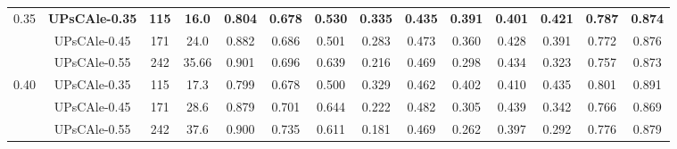 \begin{table*}
\begin{scriptsize}
\begin{tabular}{|c||c|c|c|c||c|c|c|c|c|c|c|c|c|}
\multirow{3}{*}{0.35} 
& \textbf{UPsCAle-0.35 }& \textbf{115}&\textbf{16.0} &\textbf{0.804} & \textbf{0.678} &  \textbf{0.530 }& \textbf{0.335 }& \textbf{0.435} & \textbf{0.391} & \textbf{0.401 }& \textbf{0.421} &\textbf{ 0.787} & \textbf{0.874}
\\ 
 & UPsCAle-0.45 & 171&24.0 &0.882 & 0.686 &  0.501 & 0.283 & 0.473 & 0.360 & 0.428 & 0.391 & 0.772 & 0.876
\\ 
 & UPsCAle-0.55 & 242&35.66 &0.901 & 0.696 &  0.639 & 0.216 & 0.469 & 0.298 & 0.434 & 0.323 & 0.757 & 0.873
\\ \hline

\multirow{3}{*}{0.40} 
 & UPsCAle-0.35 & 115&17.3 &0.799 & 0.678 &  0.500 & 0.329 & 0.462 & 0.402 & 0.410 & 0.435 & 0.801 & 0.891
\\ 
 & UPsCAle-0.45 & 171&28.6 &0.879 & 0.701 &  0.644 & 0.222 & 0.482 & 0.305 & 0.439 & 0.342 & 0.766 & 0.869
\\ 
 & UPsCAle-0.55 & 242&37.6 &0.900 & 0.735 &  0.611 & 0.181 & 0.469 & 0.262 & 0.397 & 0.292 & 0.776 & 0.879
\\ \hline


\end{tabular}


\end{scriptsize}
\end{table*}

